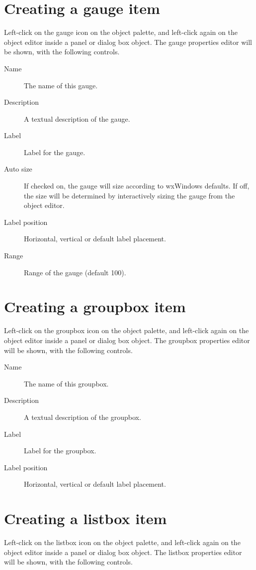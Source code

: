 \section{Creating a gauge item}

Left-click on the gauge icon on the object palette, and left-click
again on the object editor inside a panel or dialog box object. The
gauge properties editor will be shown, with the following
controls.

\begin{description}
\item[Name] The name of this gauge.
\item[Description] A textual description of the gauge.
\item[Label] Label for the gauge.
\item[Auto size] If checked on, the gauge will size according to
wxWindows defaults. If off, the size will be determined by interactively sizing
the gauge from the object editor.
\item[Label position] Horizontal, vertical or default label placement.
\item[Range] Range of the gauge (default 100).
\end{description}

\section{Creating a groupbox item}

Left-click on the groupbox icon on the object palette, and left-click
again on the object editor inside a panel or dialog box object. The
groupbox properties editor will be shown, with the following
controls.

\begin{description}
\item[Name] The name of this groupbox.
\item[Description] A textual description of the groupbox.
\item[Label] Label for the groupbox.
\item[Label position] Horizontal, vertical or default label placement.
\end{description}

\section{Creating a listbox item}

Left-click on the listbox icon on the object palette, and left-click
again on the object editor inside a panel or dialog box object. The
listbox properties editor will be shown, with the following
controls.

